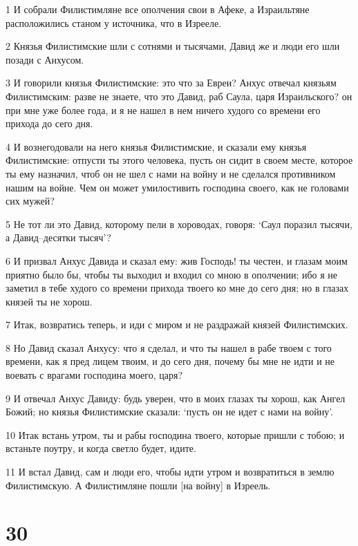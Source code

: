 \par 1 И собрали Филистимляне все ополчения свои в Афеке, а Израильтяне расположились станом у источника, что в Изрееле.
\par 2 Князья Филистимские шли с сотнями и тысячами, Давид же и люди его шли позади с Анхусом.
\par 3 И говорили князья Филистимские: это что за Евреи? Анхус отвечал князьям Филистимским: разве не знаете, что это Давид, раб Саула, царя Израильского? он при мне уже более года, и я не нашел в нем ничего худого со времени его прихода до сего дня.
\par 4 И вознегодовали на него князья Филистимские, и сказали ему князья Филистимские: отпусти ты этого человека, пусть он сидит в своем месте, которое ты ему назначил, чтоб он не шел с нами на войну и не сделался противником нашим на войне. Чем он может умилостивить господина своего, как не головами сих мужей?
\par 5 Не тот ли это Давид, которому пели в хороводах, говоря: `Саул поразил тысячи, а Давид--десятки тысяч'?
\par 6 И призвал Анхус Давида и сказал ему: жив Господь! ты честен, и глазам моим приятно было бы, чтобы ты выходил и входил со мною в ополчении; ибо я не заметил в тебе худого со времени прихода твоего ко мне до сего дня; но в глазах князей ты не хорош.
\par 7 Итак, возвратись теперь, и иди с миром и не раздражай князей Филистимских.
\par 8 Но Давид сказал Анхусу: что я сделал, и что ты нашел в рабе твоем с того времени, как я пред лицем твоим, и до сего дня, почему бы мне не идти и не воевать с врагами господина моего, царя?
\par 9 И отвечал Анхус Давиду: будь уверен, что в моих глазах ты хорош, как Ангел Божий; но князья Филистимские сказали: `пусть он не идет с нами на войну'.
\par 10 Итак встань утром, ты и рабы господина твоего, которые пришли с тобою; и встаньте поутру, и когда светло будет, идите.
\par 11 И встал Давид, сам и люди его, чтобы идти утром и возвратиться в землю Филистимскую. А Филистимляне пошли [на войну] в Изреель.

\chapter{30}

